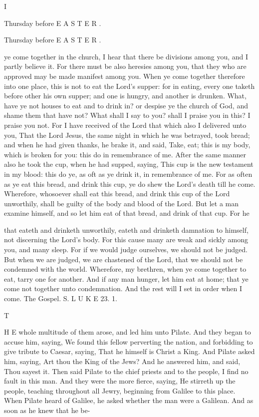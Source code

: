 I

Thursday before E A S T E R .

Thursday before E A S T E R .

ye come together in the church, I hear that there be divisions among you, and I partly believe it. For there must be also heresies among you, that they who are approved may be made manifest among you. When ye come together therefore into one place, this is not to eat the Lord’s supper: for in eating, every one taketh before other his own supper; and one is hungry, and another is drunken. What, have ye not houses to eat and to drink in? or despise ye the church of God, and shame them that have not? What shall I say to you? shall I praise you in this? I praise you not. For I have received of the Lord that which also I delivered unto you, That the Lord Jesus, the same night in which he was betrayed, took bread; and when he had given thanks, he brake it, and said, Take, eat; this is my body, which is broken for you: this do in remembrance of me. After the same manner also he took the cup, when he had supped, saying, This cup is the new testament in my blood: this do ye, as oft as ye drink it, in remembrance of me. For as often as ye eat this bread, and drink this cup, ye do shew the Lord’s death till he come. Wherefore, whosoever shall eat this bread, and drink this cup of the Lord unworthily, shall be guilty of the body and blood of the Lord. But let a man examine himself, and so let him eat of that bread, and drink of that cup. For he

that eateth and drinketh unworthily, eateth and drinketh damnation to himself, not discerning the Lord’s body. For this cause many are weak and sickly among you, and many sleep. For if we would judge ourselves, we should not be judged. But when we are judged, we are chastened of the Lord, that we should not be condemned with the world. Wherefore, my brethren, when ye come together to eat, tarry one for another. And if any man hunger, let him eat at home; that ye come not together unto condemnation. And the rest will I set in order when I come. The Gospel. S. L U K E 23. 1.

T

H E whole multitude of them arose, and led him unto Pilate. And they began to accuse him, saying, We found this fellow perverting the nation, and forbidding to give tribute to Caesar, saying, That he himself is Christ a King. And Pilate asked him, saying, Art thou the King of the Jews? And he answered him, and said, Thou sayest it. Then said Pilate to the chief priests and to the people, I find no fault in this man. And they were the more fierce, saying, He stirreth up the people, teaching throughout all Jewry, beginning from Galilee to this place. When Pilate heard of Galilee, he asked whether the man were a Galilean. And as soon as he knew that he be-

